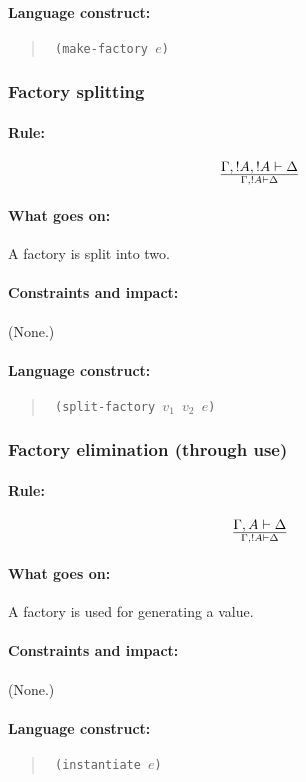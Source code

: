 \documentclass[a4paper]{article}
\begin{document}
\paragraph{Language construct:}
\begin{quote}\tt
  (make-factory $e$)
\end{quote}

\subsubsection{Factory splitting}
\paragraph{Rule:}
$$
{
  \Gamma, !A, !A \vdash \Delta
}\over{
  \Gamma, !A \vdash \Delta
}
$$
\paragraph{What goes on:} A factory is split into two.
\paragraph{Constraints and impact:} (None.)
\paragraph{Language construct:}
\begin{quote}\tt
  (split-factory $v_1$ $v_2$ $e$)
\end{quote}

\subsubsection{Factory elimination (through use)}
\paragraph{Rule:}
$$
{
  \Gamma, A \vdash \Delta
}\over{
  \Gamma, !A \vdash \Delta
}
$$
\paragraph{What goes on:} A factory is used for generating a value.
\paragraph{Constraints and impact:} (None.)
\paragraph{Language construct:}
\begin{quote}\tt
  (instantiate $e$)
\end{quote}
\end{document}
